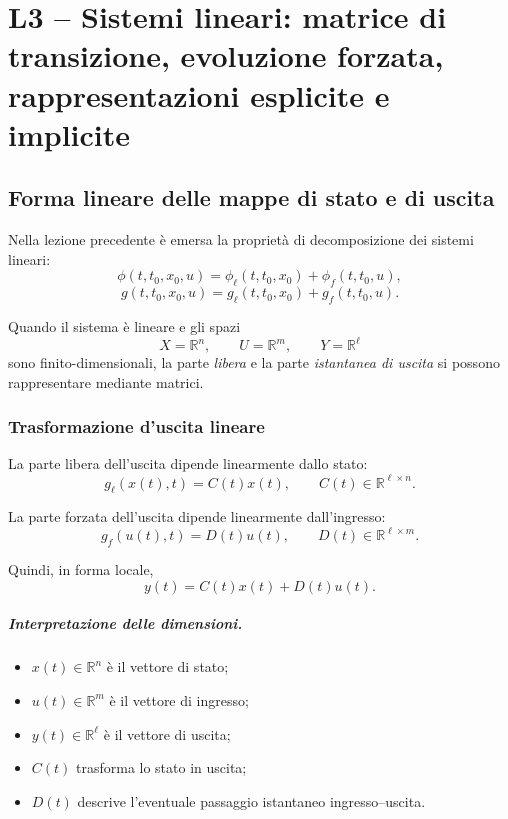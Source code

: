 \chapter{L3 -- Sistemi lineari: matrice di transizione, evoluzione forzata, rappresentazioni esplicite e implicite}

\section{Forma lineare delle mappe di stato e di uscita}

Nella lezione precedente è emersa la proprietà di decomposizione dei sistemi lineari:
\[
\phi(t,t_0,x_0,u)=\phi_\ell(t,t_0,x_0)+\phi_f(t,t_0,u),
\]
\[
g(t,t_0,x_0,u)=g_\ell(t,t_0,x_0)+g_f(t,t_0,u).
\]

Quando il sistema è lineare e gli spazi
\[
X=\mathbb{R}^n,\qquad U=\mathbb{R}^m,\qquad Y=\mathbb{R}^{\ell}
\]
sono finito-dimensionali, la parte \emph{libera} e la parte \emph{istantanea di uscita} si possono rappresentare mediante matrici.

\subsection{Trasformazione d'uscita lineare}

La parte libera dell'uscita dipende linearmente dallo stato:
\[
g_\ell(x(t),t)=C(t)x(t),
\qquad
C(t)\in\mathbb{R}^{\ell\times n}.
\]

La parte forzata dell'uscita dipende linearmente dall'ingresso:
\[
g_f(u(t),t)=D(t)u(t),
\qquad
D(t)\in\mathbb{R}^{\ell\times m}.
\]

Quindi, in forma locale,
\begin{equation}
y(t)=C(t)x(t)+D(t)u(t).
\label{eq:L3_output_local}
\end{equation}

\paragraph{Interpretazione delle dimensioni.}
\begin{itemize}
    \item $x(t)\in \mathbb{R}^n$ è il vettore di stato;
    \item $u(t)\in \mathbb{R}^m$ è il vettore di ingresso;
    \item $y(t)\in \mathbb{R}^{\ell}$ è il vettore di uscita;
    \item $C(t)$ trasforma lo stato in uscita;
    \item $D(t)$ descrive l'eventuale passaggio istantaneo ingresso--uscita.
\end{itemize}

